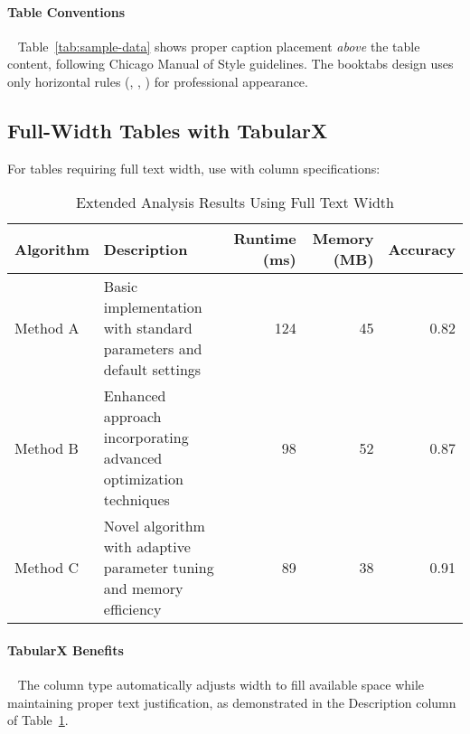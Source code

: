 \documentclass[11pt]{article}
\begin{document}
\paragraph{Table Conventions}~ Table~\ref{tab:sample-data} shows proper caption placement \emph{above} the table content, following Chicago Manual of Style guidelines. The booktabs design uses only horizontal rules (, , ) for professional appearance.

\subsection{Full-Width Tables with TabularX}

For tables requiring full text width, use  with  column specifications:

\begin{table}[tbp]
  \caption{Extended Analysis Results Using Full Text Width}
  \label{tab:extended-results}
  \centering
  \begin{tabularx}{\textwidth}{@{}lXrrr@{}}
    \toprule
    Algorithm & Description & Runtime (ms) & Memory (MB) & Accuracy \\
    \midrule
    Method A & Basic implementation with standard parameters and default settings & 124 & 45 & 0.82 \\
    Method B & Enhanced approach incorporating advanced optimization techniques & 98 & 52 & 0.87 \\
    Method C & Novel algorithm with adaptive parameter tuning and memory efficiency & 89 & 38 & 0.91 \\
    \bottomrule
  \end{tabularx}
  \begin{tablenotes}
  \end{tablenotes}
\end{table}

\paragraph{TabularX Benefits}~ The  column type automatically adjusts width to fill available space while maintaining proper text justification, as demonstrated in the Description column of Table~\ref{tab:extended-results}.
\end{document}
